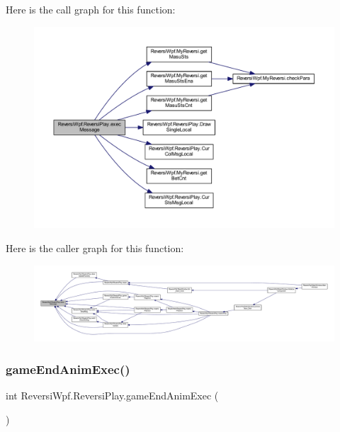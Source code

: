 Here is the call graph for this function\+:
\nopagebreak
\begin{figure}[H]
\begin{center}
\leavevmode
\includegraphics[width=350pt]{class_reversi_wpf_1_1_reversi_play_aa9c1ae9fc1af06e7e73f9db980cf0cfa_cgraph}
\end{center}
\end{figure}
Here is the caller graph for this function\+:
\nopagebreak
\begin{figure}[H]
\begin{center}
\leavevmode
\includegraphics[width=350pt]{class_reversi_wpf_1_1_reversi_play_aa9c1ae9fc1af06e7e73f9db980cf0cfa_icgraph}
\end{center}
\end{figure}
\mbox{\label{class_reversi_wpf_1_1_reversi_play_a222edc5a1161d4859635ef87d46da59c}} 
\subsubsection{\texorpdfstring{game\+End\+Anim\+Exec()}{gameEndAnimExec()}}
{\footnotesize\ttfamily int Reversi\+Wpf.\+Reversi\+Play.\+game\+End\+Anim\+Exec (\begin{DoxyParamCaption}{ }\end{DoxyParamCaption})}



